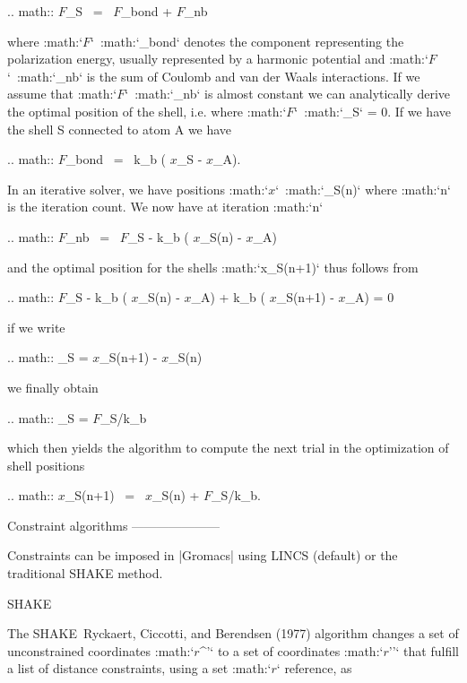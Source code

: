 .. math:: {\mbox{\boldmath ${F}$}}_S ~=~ {\mbox{\boldmath ${F}$}}_{bond} + {\mbox{\boldmath ${F}$}}_{nb}

where 
:math:`{\mbox{\boldmath ${F}$}}`\ :math:`_{bond}` denotes the
component representing the polarization energy, usually represented by a
harmonic potential and
:math:`{\mbox{\boldmath ${F}$}}`\ :math:`_{nb}` is the sum of Coulomb
and van der Waals interactions. If we assume that
:math:`{\mbox{\boldmath ${F}$}}`\ :math:`_{nb}` is almost constant we
can analytically derive the optimal position of the shell, i.e. where
:math:`{\mbox{\boldmath ${F}$}}`\ :math:`_S` = 0. If we have the
shell S connected to atom A we have

.. math:: {\mbox{\boldmath ${F}$}}_{bond} ~=~ k_b \left( {\mbox{\boldmath ${x}$}}_S - {\mbox{\boldmath ${x}$}}_A\right).

In an iterative solver, we have positions
:math:`{\mbox{\boldmath ${x}$}}`\ :math:`_S(n)` where :math:`n` is
the iteration count. We now have at iteration :math:`n`

.. math:: {\mbox{\boldmath ${F}$}}_{nb} ~=~ {\mbox{\boldmath ${F}$}}_S - k_b \left( {\mbox{\boldmath ${x}$}}_S(n) - {\mbox{\boldmath ${x}$}}_A\right)

and the optimal position for the shells :math:`x_S(n+1)` thus follows
from

.. math:: {\mbox{\boldmath ${F}$}}_S - k_b \left( {\mbox{\boldmath ${x}$}}_S(n) - {\mbox{\boldmath ${x}$}}_A\right) + k_b \left( {\mbox{\boldmath ${x}$}}_S(n+1) - {\mbox{\boldmath ${x}$}}_A\right) = 0

if we write

.. math:: _S = {\mbox{\boldmath ${x}$}}_S(n+1) - {\mbox{\boldmath ${x}$}}_S(n)

we finally obtain

.. math:: _S = {\mbox{\boldmath ${F}$}}_S/k_b

which then yields the algorithm to compute the next trial in the
optimization of shell positions

.. math:: {\mbox{\boldmath ${x}$}}_S(n+1) ~=~ {\mbox{\boldmath ${x}$}}_S(n) + {\mbox{\boldmath ${F}$}}_S/k_b.

Constraint algorithms
---------------------

Constraints can be imposed in |Gromacs| using LINCS (default) or the
traditional SHAKE method.

SHAKE
~~~~~

The SHAKE Ryckaert, Ciccotti, and Berendsen (1977) algorithm changes a
set of unconstrained coordinates :math:`{\mbox{\boldmath ${r}$}}^{'}` to
a set of coordinates :math:`{\mbox{\boldmath ${r}$}}''` that fulfill a
list of distance constraints, using a set
:math:`{\mbox{\boldmath ${r}$}}` reference, as

